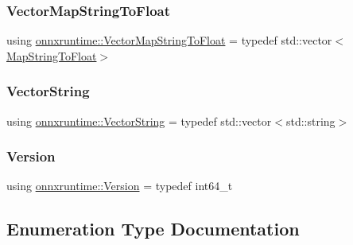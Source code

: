 \mbox{\label{namespaceonnxruntime_ad81ea65e662ec287bc0dba29bdc641a0}} 
\subsubsection{\texorpdfstring{Vector\+Map\+String\+To\+Float}{VectorMapStringToFloat}}
{\footnotesize\ttfamily using \mbox{\hyperlink{namespaceonnxruntime_ad81ea65e662ec287bc0dba29bdc641a0}{onnxruntime\+::\+Vector\+Map\+String\+To\+Float}} = typedef std\+::vector$<$\mbox{\hyperlink{namespaceonnxruntime_af68ce46a8b6ce3aecf826a569e1e9b62}{Map\+String\+To\+Float}}$>$}

\mbox{\label{namespaceonnxruntime_a5673dbc843633267038ba098bc783f6d}} 
\subsubsection{\texorpdfstring{Vector\+String}{VectorString}}
{\footnotesize\ttfamily using \mbox{\hyperlink{namespaceonnxruntime_a5673dbc843633267038ba098bc783f6d}{onnxruntime\+::\+Vector\+String}} = typedef std\+::vector$<$std\+::string$>$}

\mbox{\label{namespaceonnxruntime_ab7fae8d5830807c074def3bb8ae23cf1}} 
\subsubsection{\texorpdfstring{Version}{Version}}
{\footnotesize\ttfamily using \mbox{\hyperlink{namespaceonnxruntime_ab7fae8d5830807c074def3bb8ae23cf1}{onnxruntime\+::\+Version}} = typedef int64\+\_\+t}



\subsection{Enumeration Type Documentation}
\mbox{\label{namespaceonnxruntime_a96c3d8f2cb52b6f3e388d72f37e6fc7c}} 
